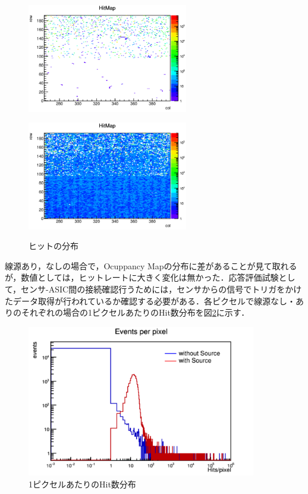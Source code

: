 \begin{figure}[h]
  \centering
  \begin{minipage}[b]{0.45\linewidth}
    \centering
    \includegraphics[width=7cm]{./figure/selftrigwo.png}
    \label{fig:selfwo}
  \end{minipage}
  \begin{minipage}[b]{0.45\linewidth}
    \centering
    \includegraphics[width=7cm]{./figure/selftrigw.png}
    \label{fig:selfo}
  \end{minipage}
  \caption{ヒットの分布}
  \label{fig:self}
\end{figure}

線源あり，なしの場合で，Ocuppancy Mapの分布に差があることが見て取れるが，数値としては，ヒットレートに大きく変化は無かった．応答評価試験として，センサ-ASIC間の接続確認行うためには，センサからの信号でトリガをかけたデータ取得が行われているか確認する必要がある．各ピクセルで線源なし・ありのそれぞれの場合の1ピクセルあたりのHit数分布を図\ref{fig:selfhitfreq}に示す．

\begin{figure}[h]
  \centering
  \includegraphics[width=10cm]{./figure/selfhitfreq.png}
  \caption{1ピクセルあたりのHit数分布}
  \label{fig:selfhitfreq}
\end{figure}

